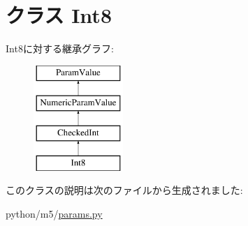 \hypertarget{classm5_1_1params_1_1Int8}{
\section{クラス Int8}
\label{classm5_1_1params_1_1Int8}
}
Int8に対する継承グラフ:\begin{figure}[H]
\begin{center}
\leavevmode
\includegraphics[height=4cm]{classm5_1_1params_1_1Int8}
\end{center}
\end{figure}


このクラスの説明は次のファイルから生成されました:\begin{DoxyCompactItemize}
\item 
python/m5/\hyperlink{params_8py}{params.py}\end{DoxyCompactItemize}
